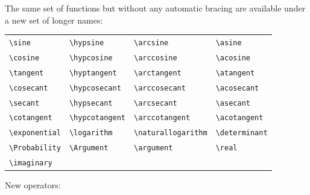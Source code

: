 \documentclass[a4paper,12pt]{article}
\begin{document}
The same set of functions but without any automatic bracing are available under a new set of longer names:
\begin{longtable}[c]{llll}
\verb|\sine| & \verb|\hypsine| & \verb|\arcsine| & \verb|\asine| \\
\verb|\cosine| & \verb|\hypcosine| & \verb|\arccosine| & \verb|\acosine| \\
\verb|\tangent| & \verb|\hyptangent| & \verb|\arctangent| & \verb|\atangent| \\
\verb|\cosecant| & \verb|\hypcosecant| & \verb|\arccosecant| & \verb|\acosecant| \\
\verb|\secant| & \verb|\hypsecant| & \verb|\arcsecant| & \verb|\asecant| \\
\verb|\cotangent| & \verb|\hypcotangent| & \verb|\arccotangent| & \verb|\acotangent|\\
\verb|\exponential| & \verb|\logarithm| & \verb|\naturallogarithm| & \verb|\determinant| \\
\verb|\Probability| & \verb|\Argument| & \verb|\argument| & \verb|\real| \\
\verb|\imaginary| \\
\end{longtable}
New operators:
\end{document}
